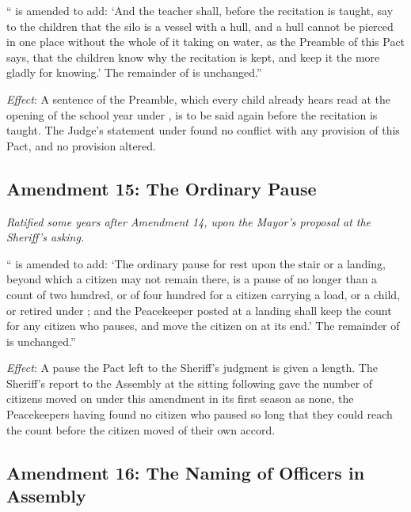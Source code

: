 `` is amended to add: `And the teacher shall, before the recitation is taught, say to the children that the silo is a vessel with a hull, and a hull cannot be pierced in one place without the whole of it taking on water, as the Preamble of this Pact says, that the children know why the recitation is kept, and keep it the more gladly for knowing.' The remainder of  is unchanged.''

\textit{Effect}: A sentence of the Preamble, which every child already hears read at the opening of the school year under , is to be said again before the recitation is taught. The Judge's statement under  found no conflict with any provision of this Pact, and no provision altered.

\subsection*{Amendment 15: The Ordinary Pause}

\textit{Ratified some years after Amendment 14, upon the Mayor's proposal at the Sheriff's asking.}

`` is amended to add: `The ordinary pause for rest upon the stair or a landing, beyond which a citizen may not remain there, is a pause of no longer than a count of two hundred, or of four hundred for a citizen carrying a load, or a child, or retired under ; and the Peacekeeper posted at a landing shall keep the count for any citizen who pauses, and move the citizen on at its end.' The remainder of  is unchanged.''

\textit{Effect}: A pause the Pact left to the Sheriff's judgment is given a length. The Sheriff's report to the Assembly at the sitting following gave the number of citizens moved on under this amendment in its first season as none, the Peacekeepers having found no citizen who paused so long that they could reach the count before the citizen moved of their own accord.

\subsection*{Amendment 16: The Naming of Officers in Assembly}

